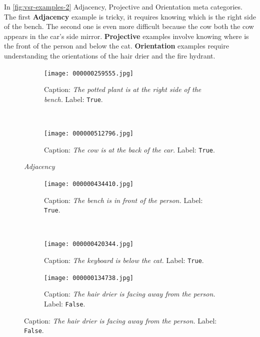 In \cref{fig:vsr-examples-2} Adjacency, Projective and Orientation meta categories. The first \textbf{Adjacency} example is tricky, it requires knowing which is the right side of the bench. The second one is even more difficult because the cow both the cow appears in the car’s side mirror. \textbf{Projective} examples involve knowing where is the front of the person and below the cat. \textbf{Orientation} examples require understanding the orientations of the hair drier and the fire hydrant.

\begin{figure}[ht]
\centering
    \begin{minipage}[t]{.30\textwidth}
        \begin{subfigure}[t]{\textwidth}
        \centering
        \texttt{[image: 000000259555.jpg]}
        \caption{Caption: \textit{The potted plant is at the right side of the bench.} Label: \texttt{True}.}
        \label{fig:potted_plant_bench}
        \end{subfigure}\\
        \begin{subfigure}[t]{\textwidth}
        \centering
        \texttt{[image: 000000512796.jpg]}
        \caption{Caption: \textit{The cow is at the back of the car.} Label: \texttt{True}.}
        \end{subfigure}%
        \caption*{\textit{Adjacency}}
    \end{minipage}
    \hfill
    \begin{minipage}[t]{.30\textwidth}
        \begin{subfigure}[t]{\textwidth}
        \centering
        \texttt{[image: 000000434410.jpg]}
        \caption{Caption: \textit{The bench is in front of the person.} Label: \texttt{True}.}
        \label{fig:bench_front_person}
        \end{subfigure}\\
        \begin{subfigure}[t]{\textwidth}
        \centering
        \texttt{[image: 000000420344.jpg]}
        \caption{Caption: \textit{The keyboard is below the cat.} Label: \texttt{True}.}
        \end{subfigure}%
        \caption*{\textit{Projective}}
    \end{minipage}
    \hfill
    \begin{minipage}[t]{.30\textwidth}
        \begin{subfigure}[t]{\textwidth}
        \centering
        \texttt{[image: 000000134738.jpg]}
        \caption{Caption: \textit{The hair drier is facing away from the person.} Label: \texttt{False}.}

\end{subfigure}
\end{minipage}
\end{figure}
